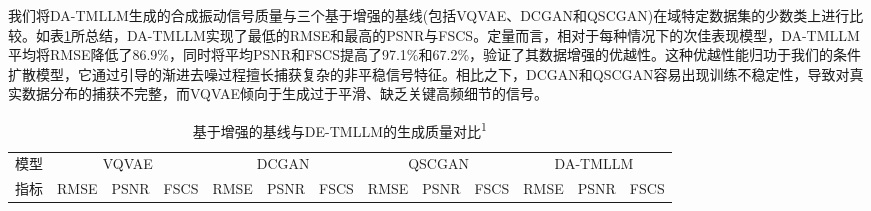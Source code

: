 \documentclass[UTF8,lettersize,journal]{IEEEtran}
\begin{document}
我们将DA-TMLLM生成的合成振动信号质量与三个基于增强的基线(包括VQVAE、DCGAN和QSCGAN)在域特定数据集的少数类上进行比较。如表\ref{tab:comparison_result2}所总结，DA-TMLLM实现了最低的RMSE和最高的PSNR与FSCS。定量而言，相对于每种情况下的次佳表现模型，DA-TMLLM平均将RMSE降低了86.9\%，同时将平均PSNR和FSCS提高了97.1\%和67.2\%，验证了其数据增强的优越性。这种优越性能归功于我们的条件扩散模型，它通过引导的渐进去噪过程擅长捕获复杂的非平稳信号特征。相比之下，DCGAN和QSCGAN容易出现训练不稳定性，导致对真实数据分布的捕获不完整，而VQVAE倾向于生成过于平滑、缺乏关键高频细节的信号。

\begin{table}[t!]
	\footnotesize
	\caption{基于增强的基线与DE-TMLLM的生成质量对比\textsuperscript{1}}
	\renewcommand{\arraystretch}{1.5}
	\centering
	\label{tab:comparison_result2}       %
	\begin{tabular}{c|c c c|c c c|c c c|c c c}
		\toprule[1pt]\noalign{\vspace{0.5pt}}
		模型&\multicolumn{3}{c|}{VQVAE}&\multicolumn{3}{c|}{DCGAN}&\multicolumn{3}{c|}{QSCGAN}&\multicolumn{3}{c}{DA-TMLLM}
		\\\cmidrule(lr){2-4}\cmidrule(lr){5-7}\cmidrule(lr){8-10}\cmidrule(lr){11-13}
		指标&RMSE &PSNR &FSCS &RMSE &PSNR &FSCS &RMSE &PSNR &FSCS &RMSE &PSNR &FSCS \\\midrule[1pt]
		

\end{tabular}
\end{table}
\end{document}
